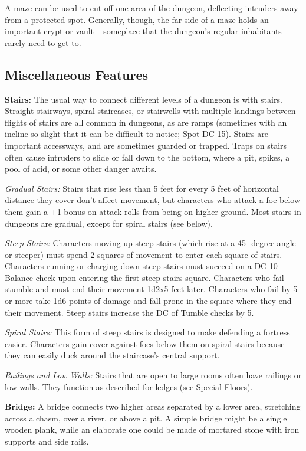 A maze can be used to cut off one area of the dungeon, deflecting intruders away 
from a protected spot. Generally, though, the far side of a maze holds an important 
crypt or vault -- someplace that the dungeon's regular inhabitants rarely need to 
get to.

\subsection{Miscellaneous Features}

\textbf{Stairs:} The usual way to connect different levels of a dungeon is with 
stairs. Straight stairways, spiral staircases, or stairwells with multiple landings 
between flights of stairs are all common in dungeons, as are ramps (sometimes with 
an incline so slight that it can be difficult to notice; Spot DC 15). Stairs are 
important accessways, and are sometimes guarded or trapped. Traps on stairs often 
cause intruders to slide or fall down to the bottom, where a pit, spikes, a pool 
of acid, or some other danger awaits.

\textit{Gradual Stairs:} Stairs that rise less than 5 feet for every 5 feet of 
horizontal distance they cover don't affect movement, but characters who attack 
a foe below them gain a +1 bonus on attack rolls from being on higher ground. Most 
stairs in dungeons are gradual, except for spiral stairs (see below).

\textit{Steep Stairs:} Characters moving up steep stairs (which rise at a 45- degree 
angle or steeper) must spend 2 squares of movement to enter each square of stairs. 
Characters running or charging down steep stairs must succeed on a DC 10 Balance 
check upon entering the first steep stairs square. Characters who fail stumble 
and must end their movement 1d2x5 feet later. Characters who 
fail by 5 or more take 1d6 points of damage and fall prone in the square where 
they end their movement. Steep stairs increase the DC of Tumble checks by 5.

\textit{Spiral Stairs:} This form of steep stairs is designed to make defending 
a fortress easier. Characters gain cover against foes below them on spiral stairs 
because they can easily duck around the staircase's central support.

\textit{Railings and Low Walls:} Stairs that are open to large rooms often have 
railings or low walls. They function as described for ledges (see Special Floors).

\textbf{Bridge:} A bridge connects two higher areas separated by a lower area, 
stretching across a chasm, over a river, or above a pit. A simple bridge might 
be a single wooden plank, while an elaborate one could be made of mortared stone 
with iron supports and side rails.

